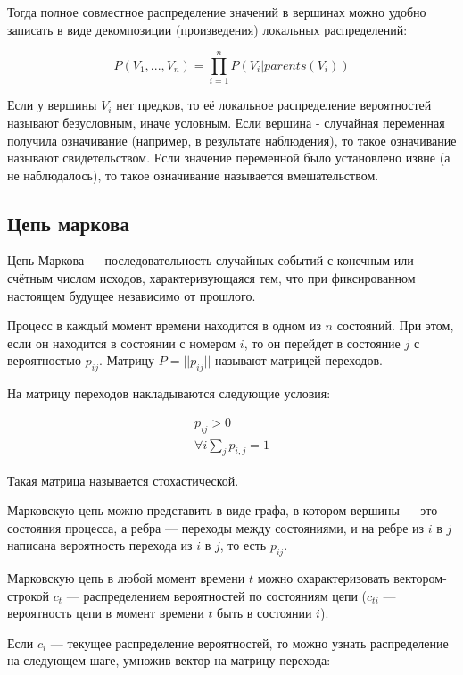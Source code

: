 Тогда полное совместное распределение значений в вершинах можно удобно записать в виде декомпозиции (произведения) локальных распределений:

\begin{equation}
	P(V_1,...,V_n)=\prod_{i=1}^{n}P(V_i|parents(V_i))
\end{equation}

Если у вершины $V_i$ нет предков, то её локальное распределение вероятностей называют безусловным, иначе условным. Если вершина - случайная переменная получила означивание (например, в результате наблюдения), то такое означивание называют свидетельством. Если значение переменной было установлено извне (а не наблюдалось), то такое означивание называется вмешательством.

\subsection{Цепь маркова}
Цепь Маркова — последовательность случайных событий с конечным или счётным числом исходов, характеризующаяся тем, что при фиксированном настоящем будущее независимо от прошлого.

Процесс в каждый момент времени находится в одном из $n$ состояний. 
При этом, если он находится в состоянии с номером $i$, то он перейдет в состояние $j$ с вероятностью $p_{ij}$.
Матрицу $P=||p_{ij}||$ называют матрицей переходов.

На матрицу переходов накладываются следующие условия: 

\begin{subequations}
\begin{align}
  p_{ij}>0 \\
  \forall i \sum_j p_{i,j}=1
\end{align}
\end{subequations}

Такая матрица называется стохастической.

Марковскую цепь можно представить в виде графа, в котором вершины — это состояния процесса, а ребра — переходы между состояниями, и на ребре из $i$ в $j$ написана вероятность перехода из $i$ в $j$, то есть $p_{ij}$. 

Марковскую цепь в любой момент времени $t$ можно охарактеризовать вектором-строкой $c_t$ — распределением вероятностей по состояниям цепи ($c_{ti}$ — вероятность цепи в момент времени $t$ быть в состоянии $i$). 

Если $c_i$ — текущее распределение вероятностей, то можно узнать распределение на следующем шаге, умножив вектор на матрицу перехода: 


